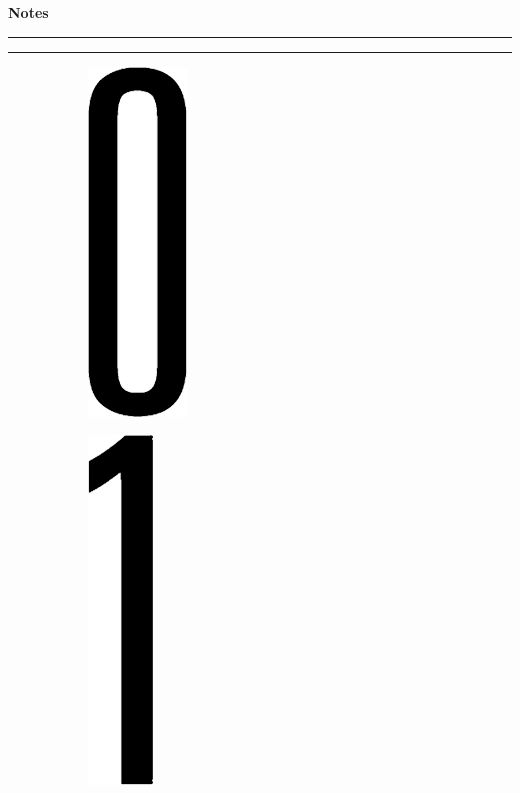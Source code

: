 \newpage
\begin{notesbox}
\textbf{Notes} \\
\rule{\linewidth}{0.02cm}
\end{notesbox}


\newpage
\rule{\linewidth}{0.1cm} \par
\begin{figure}[H]
  \begin{subfigure}[l]{0.15\textwidth}
    \includegraphics[height=0.35\textheight]{Sources/PortalNumbers/0.jpg}
  \end{subfigure}
  \hspace{0.3cm}
  \begin{subfigure}[l]{0.5\textwidth}
    \includegraphics[height=0.35\textheight]{Sources/PortalNumbers/1.jpg}
  \end{subfigure}
  
\end{figure}

